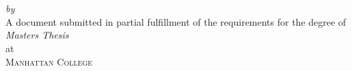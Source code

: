 \begin{titlepage}
  \vspace*{5cm}
  \makeatletter
  \begin{center}
    \begin{Huge}
      \@title
    \end{Huge}\\[0.1cm]
    \begin{Large}
      \@subtitle
    \end{Large}\\
    \emph{by}\\
    \@author
    \vfill
    A document submitted in partial fulfillment
    of the requirements for the degree of\\
    \emph{Masters Thesis}\\
    at\\
    \textsc{Manhattan College}
  \end{center}
  \makeatother
\end{titlepage}

\newpage
\null
\thispagestyle{empty}
\newpage
